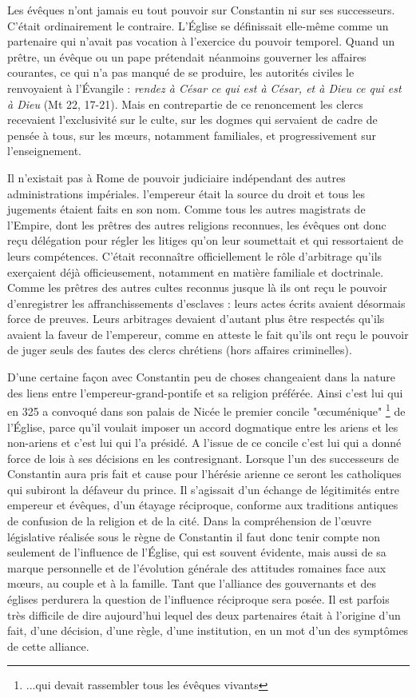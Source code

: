 Les évêques n'ont jamais eu tout pouvoir sur Constantin ni sur ses successeurs. C'était ordinairement le contraire. L'Église se définissait elle-même comme un partenaire qui n'avait pas vocation à l'exercice du pouvoir temporel. Quand un prêtre, un évêque ou un pape prétendait néanmoins gouverner les affaires courantes, ce qui n'a pas manqué de se produire, les autorités civiles le renvoyaient à l'Évangile : \emph{rendez à César ce qui est à César, et à Dieu ce qui est à Dieu} (Mt 22, 17-21). Mais en contrepartie de ce renoncement les clercs recevaient l'exclusivité sur le culte, sur les dogmes qui servaient de cadre de pensée à tous, sur les mœurs, notamment familiales, et progressivement sur l'enseignement. 

 Il n'existait pas à Rome de pouvoir judiciaire indépendant des autres administrations impériales. l'empereur était la source du droit et tous les jugements étaient faits en son nom. Comme tous les autres magistrats de l'Empire, dont les prêtres des autres religions reconnues, les évêques ont donc reçu délégation pour régler les litiges qu'on leur soumettait et qui ressortaient de leurs compétences. C'était reconnaître officiellement le rôle d'arbitrage qu'ils exerçaient déjà officieusement, notamment en matière familiale et doctrinale. Comme les prêtres des autres cultes reconnus jusque là ils ont reçu le pouvoir d'enregistrer les affranchissements d'esclaves : leurs actes écrits avaient désormais force de preuves. Leurs arbitrages devaient d'autant plus être respectés qu'ils avaient la faveur de l'empereur, comme en atteste le fait qu'ils ont reçu le pouvoir de juger seuls des fautes des clercs chrétiens (hors affaires criminelles).
 
 

D'une certaine façon avec Constantin peu de choses changeaient dans la nature des liens entre l'empereur-grand-pontife et sa religion préférée. Ainsi c'est lui qui en 325 a convoqué dans son palais de Nicée le premier concile "œcuménique"
\footnote{...qui devait rassembler tous les évêques vivants} 
de l'Église, parce qu'il voulait imposer un accord dogmatique entre les ariens et les non-ariens et c'est lui qui l'a présidé. A l'issue de ce concile c'est lui qui a donné force de lois à ses décisions en les contresignant. Lorsque l'un des successeurs de Constantin aura pris fait et cause pour l'hérésie arienne ce seront les catholiques qui subiront la défaveur du prince. Il s'agissait d'un échange de légitimités entre empereur et évêques, d'un étayage réciproque, conforme aux traditions antiques de confusion de la religion et de la cité. Dans la compréhension de l'œuvre législative réalisée sous le règne de Constantin il faut donc tenir compte non seulement de l'influence de l'Église, qui est souvent évidente, mais aussi de sa marque personnelle et de l'évolution générale des attitudes romaines face aux mœurs, au couple et à la famille. Tant que l'alliance des gouvernants et des églises perdurera la question de l'influence réciproque sera posée. Il est parfois très difficile de dire aujourd'hui lequel des deux partenaires était à l'origine d'un fait, d'une décision, d'une règle, d'une institution, en un mot d'un des symptômes de cette alliance. 

